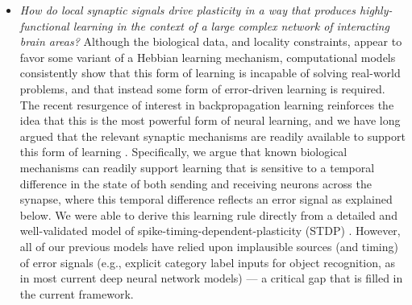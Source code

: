 \documentclass[11pt,twoside]{article}
\newif\myifpdf
\begin{document}
\begin{itemize}
\item {\em How do local synaptic signals drive plasticity in a way that produces highly-functional learning in the context of a large complex network of interacting brain areas?}  Although the biological data, and locality constraints, appear to favor some variant of a Hebbian learning mechanism, computational models consistently show that this form of learning is incapable of solving real-world problems, and that instead some form of error-driven learning is required.  The recent resurgence of interest in backpropagation learning \cite{RumelhartHintonWilliams86} reinforces the idea that this is the most powerful form of neural learning, and we have long argued that the relevant synaptic mechanisms are readily available to support this form of learning \cite{OReilly96,OReillyHazyHerd15,OReillyMunakataFrankEtAl12,OReillyMunakata00}.  Specifically, we argue that known biological mechanisms can readily support learning that is sensitive to a temporal difference in the state of both sending and receiving neurons across the synapse, where this temporal difference reflects an error signal as explained below.  We were able to derive this learning rule directly from a detailed and well-validated model of spike-timing-dependent-plasticity (STDP) \cite{UrakuboHondaFroemkeEtAl08}.  However, all of our previous models have relied upon implausible sources (and timing) of error signals (e.g., explicit category label inputs for object recognition, as in most current deep neural network models) --- a critical gap that is filled in the current framework.


\end{itemize}
\end{document}

